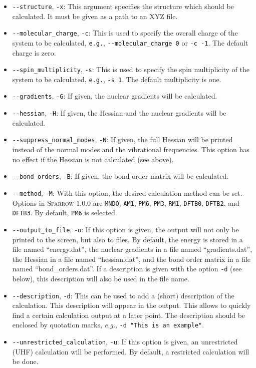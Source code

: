 \documentclass[]{tufte-book}
\begin{document}
\begin{itemize}
\item \texttt{-{}-structure}, \texttt{-x}: This argument specifies the structure which should be calculated. It must be given
as a path to an XYZ file.
\item \texttt{-{}-molecular\_charge}, \texttt{-c}: This is used to specify the overall charge of the system to be calculated, 
\texttt{e.g.}, \texttt{-{}-molecular\_charge 0} or \texttt{-c -1}. The default charge is zero.
\item \texttt{-{}-spin\_multiplicity}, \texttt{-s}: This is used to specify the spin multiplicity of the system to be
calculated, \texttt{e.g.}, \texttt{-s 1}. The default multiplicity is one.
\item \texttt{-{}-gradients}, \texttt{-G}: If given, the nuclear gradients will be calculated.
\item \texttt{-{}-hessian}, \texttt{-H}: If given, the Hessian and the nuclear gradients will be calculated.
\item \texttt{-{}-suppress\_normal\_modes}, \texttt{-N}: If given, the full Hessian will be printed instead of the normal 
modes and the vibrational frequencies. This option has no effect if the Hessian is not calculated (see above).
\item \texttt{-{}-bond\_orders}, \texttt{-B}: If given, the bond order matrix will be calculated.
\item \texttt{-{}-method}, \texttt{-M}: With this option, the desired calculation method can be set. Options in
\textsc{Sparrow} 1.0.0 are \texttt{MNDO}, \texttt{AM1}, \texttt{PM6}, \texttt{PM3}, \texttt{RM1}, \texttt{DFTB0}, \texttt{DFTB2}, and
\texttt{DFTB3}. By default, \texttt{PM6} is selected.
\item \texttt{-{}-output\_to\_file}, \texttt{-o}: If this option is given, the output will not only be printed to the screen, 
but also to files. By default, the energy is stored in a file named ``energy.dat'', the nuclear gradients in a file named
``gradients.dat'', the Hessian in a file named ``hessian.dat'', and the bond order matrix in a file named ``bond\_orders.dat''.
If a description is given with the option \texttt{-d} (see below), this description will also be used in the file name.
\item \texttt{-{}-description}, \texttt{-d}: This can be used to add a (short) description of the calculation. This
description will appear in the output. This allows to quickly find a certain calculation output at a later point. The
description should be enclosed by quotation marks, \textit{e.g.}, \texttt{-d "This is an example"}.
\item \texttt{-{}-unrestricted\_calculation}, \texttt{-u}: If this option is given, an unrestricted (UHF) calculation
will be performed. By default, a restricted calculation will be done.
\end{itemize}
\end{document}
